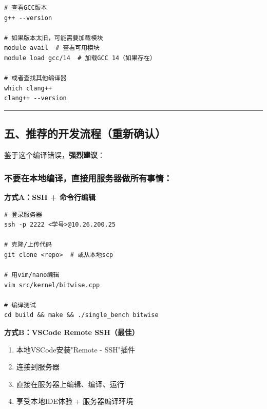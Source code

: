 \documentclass[11pt, a4paper]{article}
\begin{document}
\begin{aibox}
\begin{tcolorbox}[colback=white,colframe=gray!50!white,boxrule=0.5pt,arc=2pt,left=5pt,right=5pt,top=5pt,bottom=5pt]
\begin{verbatim}
# 查看GCC版本
g++ --version

# 如果版本太旧，可能需要加载模块
module avail  # 查看可用模块
module load gcc/14  # 加载GCC 14（如果存在）

# 或者查找其他编译器
which clang++
clang++ --version
\end{verbatim}
\end{tcolorbox}

\begin{center}\rule{\textwidth}{0.4pt}\end{center}

\subsection*{五、推荐的开发流程（重新确认）}

鉴于这个编译错误，\textbf{强烈建议}：

\subsubsection*{不要在本地编译，直接用服务器做所有事情：}

\textbf{方式A：SSH + 命令行编辑}
\begin{tcolorbox}[colback=white,colframe=gray!50!white,boxrule=0.5pt,arc=2pt,left=5pt,right=5pt,top=5pt,bottom=5pt]
\begin{verbatim}
# 登录服务器
ssh -p 2222 <学号>@10.26.200.25

# 克隆/上传代码
git clone <repo>  # 或从本地scp

# 用vim/nano编辑
vim src/kernel/bitwise.cpp

# 编译测试
cd build && make && ./single_bench bitwise
\end{verbatim}
\end{tcolorbox}

\textbf{方式B：VSCode Remote SSH（最佳）}
\begin{enumerate}
    \item 本地VSCode安装"Remote - SSH"插件
    \item 连接到服务器
    \item 直接在服务器上编辑、编译、运行
    \item 享受本地IDE体验 + 服务器编译环境
\end{enumerate}


\end{aibox}
\end{document}
